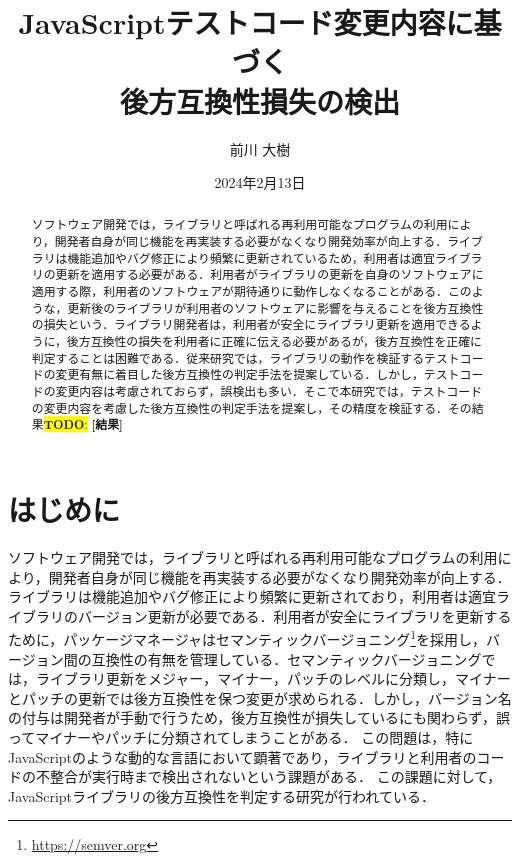 \documentclass[11pt,dvipdfmx]{jreport}
\title{JavaScriptテストコード変更内容に基づく\\後方互換性損失の検出}
\author{前川 大樹}
\date{2024年2月13日}	%
\newcommand{\todo}[1]{\colorbox{yellow}{{\bf TODO}:}{\color{red} {\textbf{[#1]}}}}
\begin{document}
\maketitle

\begin{abstract}
ソフトウェア開発では，ライブラリと呼ばれる再利用可能なプログラムの利用により，開発者自身が同じ機能を再実装する必要がなくなり開発効率が向上する．ライブラリは機能追加やバグ修正により頻繁に更新されているため，利用者は適宜ライブラリの更新を適用する必要がある．利用者がライブラリの更新を自身のソフトウェアに適用する際，利用者のソフトウェアが期待通りに動作しなくなることがある．このような，更新後のライブラリが利用者のソフトウェアに影響を与えることを後方互換性の損失という．ライブラリ開発者は，利用者が安全にライブラリ更新を適用できるように，後方互換性の損失を利用者に正確に伝える必要があるが，後方互換性を正確に判定することは困難である．従来研究では，ライブラリの動作を検証するテストコードの変更有無に着目した後方互換性の判定手法を提案している．しかし，テストコードの変更内容は考慮されておらず，誤検出も多い．そこで本研究では，テストコードの変更内容を考慮した後方互換性の判定手法を提案し，その精度を検証する．その結果\todo{結果}

\end{abstract}

\tableofcontents



\newpage
{}	%



\chapter{はじめに}
ソフトウェア開発では，ライブラリと呼ばれる再利用可能なプログラムの利用により，開発者自身が同じ機能を再実装する必要がなくなり開発効率が向上する．ライブラリは機能追加やバグ修正により頻繁に更新されており，利用者は適宜ライブラリのバージョン更新が必要である．利用者が安全にライブラリを更新するために，パッケージマネージャはセマンティックバージョニング\footnote{\url{https://semver.org}}を採用し，バージョン間の互換性の有無を管理している．セマンティックバージョニングでは，ライブラリ更新をメジャー，マイナー，パッチのレベルに分類し，マイナーとパッチの更新では後方互換性を保つ変更が求められる．しかし，バージョン名の付与は開発者が手動で行うため，後方互換性が損失しているにも関わらず，誤ってマイナーやパッチに分類されてしまうことがある．
この問題は，特にJavaScriptのような動的な言語において顕著であり，ライブラリと利用者のコードの不整合が実行時まで検出されないという課題がある．
この課題に対して，JavaScriptライブラリの後方互換性を判定する研究が行われている．
 
\end{document}
